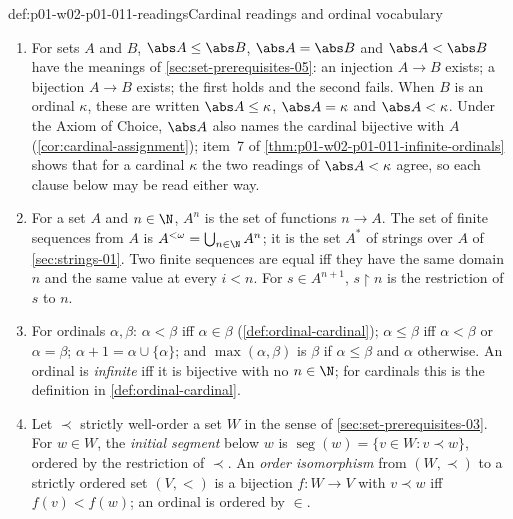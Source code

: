 \begin{hbconvention}{def:p01-w02-p01-011-readings}{Cardinal readings and ordinal vocabulary}
\begin{enumerate}
  \item For sets \(A\) and \(B\), \(\abs A\leq\abs B\), \(\abs A=\abs B\) and
        \(\abs A<\abs B\) have the meanings of \cref{sec:set-prerequisites-05}:
        an injection \(A\to B\) exists; a bijection \(A\to B\) exists; the
        first holds and the second fails. When \(B\) is an ordinal
        \(\kappa\), these are written \(\abs A\leq\kappa\),
        \(\abs A=\kappa\) and \(\abs A<\kappa\). Under the Axiom of Choice,
        \(\abs A\) also names the cardinal bijective with \(A\)
        (\cref{cor:cardinal-assignment}); item~7 of
        \cref{thm:p01-w02-p01-011-infinite-ordinals} shows that for a
        cardinal \(\kappa\) the two readings of \(\abs A<\kappa\) agree, so
        each clause below may be read either way.
  \item For a set \(A\) and \(n\in\N\), \(A^n\) is the set of functions
        \(n\to A\). The set of finite sequences from \(A\) is
        \(A^{<\omega}=\bigcup_{n\in\N}A^n\); it is the set \(A^*\) of strings
        over \(A\) of \cref{sec:strings-01}. Two finite sequences are equal
        iff they have the same domain \(n\) and the same value at every
        \(i<n\). For \(s\in A^{n+1}\), \(s\mathbin{\upharpoonright}n\) is the
        restriction of \(s\) to \(n\).
  \item For ordinals \(\alpha,\beta\): \(\alpha<\beta\) iff
        \(\alpha\in\beta\) (\cref{def:ordinal-cardinal});
        \(\alpha\leq\beta\) iff \(\alpha<\beta\) or \(\alpha=\beta\);
        \(\alpha+1=\alpha\cup\{\alpha\}\); and \(\max(\alpha,\beta)\) is
        \(\beta\) if \(\alpha\leq\beta\) and \(\alpha\) otherwise. An
        ordinal is \emph{infinite} iff it is bijective with no \(n\in\N\);
        for cardinals this is the definition in \cref{def:ordinal-cardinal}.
  \item Let \(\prec\) strictly well-order a set \(W\) in the sense of
        \cref{sec:set-prerequisites-03}. For \(w\in W\), the \emph{initial
        segment} below \(w\) is
        \(\operatorname{seg}(w)=\{v\in W:v\prec w\}\), ordered by the
        restriction of \(\prec\). An \emph{order isomorphism} from
        \((W,\prec)\) to a strictly ordered set \((V,<)\) is a bijection
        \(f:W\to V\) with \(v\prec w\) iff \(f(v)<f(w)\); an ordinal is
        ordered by \(\in\).
\end{enumerate}
\end{hbconvention}

